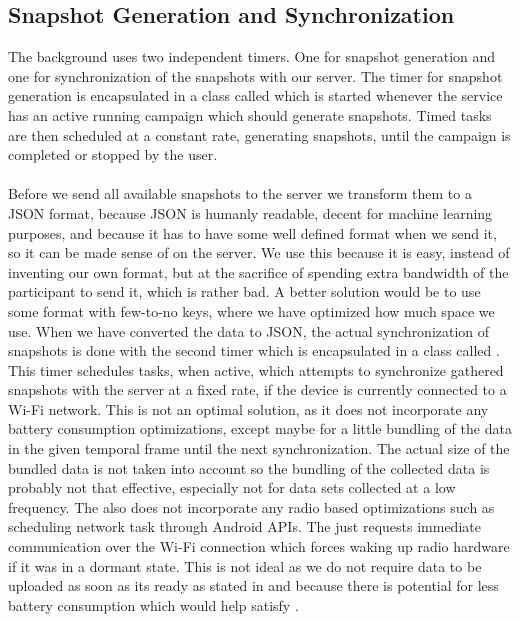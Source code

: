 \subsection{Snapshot Generation and Synchronization}
\label{sub:background_sensor_service_snapshot_generation_and_synchronization}

The background  uses two independent timers. One for snapshot generation and one for synchronization of the snapshots with our server. The timer for snapshot generation is encapsulated in a class called  which is started whenever the service has an active running campaign which should generate snapshots. Timed tasks are then scheduled at a constant rate, generating snapshots, until the campaign is completed or stopped by the user.
\\\\
Before we send all available snapshots to the server we transform them to a JSON format, because JSON is humanly readable, decent for machine learning purposes, and because it has to have some well defined format when we send it, so it can be made sense of on the server. We use this because it is easy, instead of inventing our own format, but at the sacrifice of spending extra bandwidth of the participant to send it, which is rather bad. A better solution would be to use some format with few-to-no keys, where we have optimized how much space we use. When we have converted the data to JSON, the actual synchronization of snapshots is done with the second timer which is encapsulated in a class called . This timer schedules tasks, when active, which attempts to synchronize gathered snapshots with the server at a fixed rate, if the device is currently connected to a Wi-Fi network. This is not an optimal solution, as it does not incorporate any battery consumption optimizations, except maybe for a little bundling of the data in the given temporal frame until the next synchronization. The actual size of the bundled data is not taken into account so the bundling of the collected data is probably not that effective, especially not for data sets collected at a low frequency. The  also does not incorporate any radio based optimizations such as scheduling network task through Android APIs. The  just requests immediate communication over the Wi-Fi connection which forces waking up radio hardware if it was in a dormant state. This is not ideal as we do not require data to be uploaded as soon as its ready as stated in  and because there is potential for less battery consumption which would help satisfy . 
